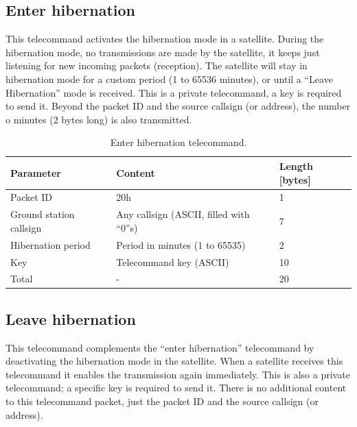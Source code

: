 \subsection{Enter hibernation}

This telecommand activates the hibernation mode in a satellite. During the hibernation mode, no transmissions are made by the satellite, it keeps just listening for new incoming packets (reception). The satellite will stay in hibernation mode for a custom period (1 to 65536 minutes), or until a ``Leave Hibernation'' mode is received. This is a private telecommand, a key is required to send it. Beyond the packet ID and the source callsign (or address), the number o minutes (2 bytes long) is also transmitted.

\begin{table}[!ht]
    \centering
    \begin{tabular}{lll}
        \toprule[1.5pt]
        \textbf{Parameter}      & \textbf{Content}                         & \textbf{Length [bytes]} \\
        \midrule
        Packet ID               & 20h                                      & 1 \\
        Ground station callsign & Any callsign (ASCII, filled with ``0''s) & 7 \\
        Hibernation period      & Period in minutes (1 to 65535)           & 2 \\
        Key                     & Telecommand key (ASCII)                  & 10 \\
        \midrule
        Total                   & -                                        & 20 \\
        \bottomrule[1.5pt]
    \end{tabular}
    \caption{Enter hibernation telecommand.}
    \label{tab:enter-hibernation-tc}
\end{table}

\subsection{Leave hibernation}

This telecommand complements the ``enter hibernation'' telecommand by deactivating the hibernation mode in the satellite. When a satellite receives this telecommand it enables the transmission again immediately. This is also a private telecommand; a specific key is required to send it. There is no additional content to this telecommand packet, just the packet ID and the source callsign (or address).


